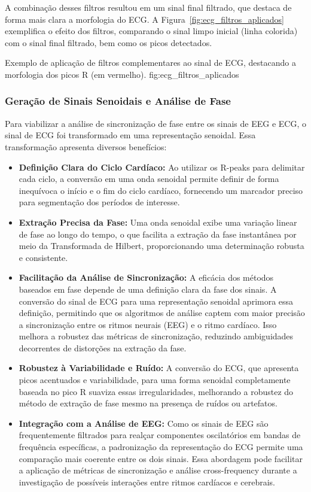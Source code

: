 A combinação desses filtros resultou em um sinal final filtrado, que destaca de forma mais clara a morfologia do ECG. A Figura~\ref{fig:ecg_filtros_aplicados} exemplifica o efeito dos filtros, comparando o sinal limpo inicial (linha colorida) com o sinal final filtrado, bem como os picos detectados.

{Exemplo de aplicação de filtros complementares ao sinal de ECG, destacando a morfologia dos picos R (em vermelho).}
{fig:ecg_filtros_aplicados}


\subsubsection{Geração de Sinais Senoidais e Análise de Fase}

Para viabilizar a análise de sincronização de fase entre os sinais de EEG e ECG, o sinal de ECG foi transformado em uma representação senoidal. Essa transformação apresenta diversos benefícios:
\begin{itemize}
    \item \textbf{Definição Clara do Ciclo Cardíaco:} Ao utilizar os R-peaks para delimitar cada ciclo, a conversão em uma onda senoidal permite definir de forma inequívoca o início e o fim do ciclo cardíaco, fornecendo um marcador preciso para segmentação dos períodos de interesse.
    \item \textbf{Extração Precisa da Fase:} Uma onda senoidal exibe uma variação linear de fase ao longo do tempo, o que facilita a extração da fase instantânea por meio da Transformada de Hilbert, proporcionando uma determinação robusta e consistente.
    \item \textbf{Facilitação da Análise de Sincronização:} A eficácia dos métodos baseados em fase depende de uma definição clara da fase dos sinais. A conversão do sinal de ECG para uma representação senoidal aprimora essa definição, permitindo que os algoritmos de análise captem com maior precisão a sincronização entre os ritmos neurais (EEG) e o ritmo cardíaco. Isso melhora a robustez das métricas de sincronização, reduzindo ambiguidades decorrentes de distorções na extração da fase.
    \item \textbf{Robustez à Variabilidade e Ruído:} A conversão do ECG, que apresenta picos acentuados e variabilidade, para uma forma senoidal completamente baseada no pico R suaviza essas irregularidades, melhorando a robustez do método de extração de fase mesmo na presença de ruídos ou artefatos.
    \item \textbf{Integração com a Análise de EEG:} Como os sinais de EEG são frequentemente filtrados para realçar componentes oscilatórios em bandas de frequência específicas, a padronização da representação do ECG permite uma comparação mais coerente entre os dois sinais. Essa abordagem pode facilitar a aplicação de métricas de sincronização e análise cross-frequency durante a investigação de possíveis interações entre ritmos cardíacos e cerebrais.
\end{itemize}

